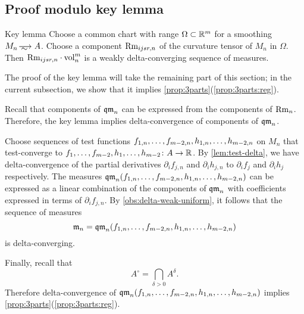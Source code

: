 \subsection{Proof modulo key lemma}\label{subsec:modulo-key}

\begin{thm}{Key lemma}\label{A^0}
Choose a common chart with range $\Omega\subset \mathbb{R}^m$ for a smoothing $M_n\smooths{} A$.
Choose a component $\operatorname{\rm Rm}_{ijsr,n}$ of the curvature tensor of $M_n$ in $\Omega$.
Then $\Rm_{ijsr,n}\cdot \vol^m_n$ is a weakly delta-converging sequence of measures.
\end{thm}

The proof of the key lemma will take the remaining part of this section;
in the current subsection, we show that it implies \ref{prop:3parts}(\ref{prop:3parts:reg}).

Recall that components of $\operatorname{\mathfrak{qm}}_n$ can be expressed from the components of $\operatorname{\rm Rm}_n$.
Therefore, the key lemma implies delta-convergence of components of $\operatorname{\mathfrak{qm}}_n$.

Choose sequences of test functions $f_{1,n},\zz\dots,f_{m-2,n},h_{1,n},\zz\dots,h_{m-2,n}$ on $M_n$ that test-converge to $f_{1},\zz\dots,f_{m-2},h_{1},\zz\dots,h_{m-2}\:A\to \RR$.
By \ref{lem:test-delta}, we have delta-convergence of the partial derivatives $\partial_if_{j,n}$ and 
$\partial_ih_{j,n}$ to $\partial_if_{j}$ and 
$\partial_ih_{j}$ respectively.
The measures $\qm_n(f_{1,n},\zz\dots,f_{m-2,n},\zz{}h_{1,n},\zz\dots,h_{m-2,n})$ 
can be expressed as a linear combination of the components of $\operatorname{\mathfrak{qm}}_n$ with coefficients expressed in terms of $\partial_if_{j,n}$.
By \ref{obs:delta-weak-uniform}, it follows that the sequence of measures 
\[\mathfrak m_n=\qm_n(f_{1,n},\dots,f_{m-2,n},h_{1,n},\zz\dots,h_{m-2,n})\]
is delta-converging.

Finally, recall that 
\[A^\circ=\bigcap_{\delta>0}A^\delta.\]
Therefore delta-convergence of $\qm_n(f_{1,n},\dots,f_{m-2,n},h_{1,n},\zz\dots,h_{m-2,n})$ implies \ref{prop:3parts}(\ref{prop:3parts:reg}).
\qeds
